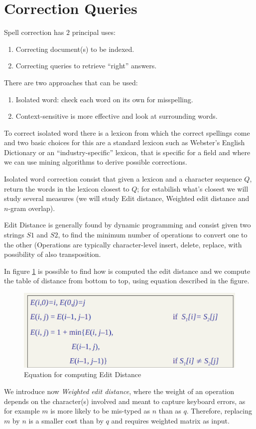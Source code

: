 \section{Correction Queries}
Spell correction has $2$ principal uses:
\begin{enumerate}
    \item Correcting document(s) to be indexed.
    \item Correcting queries to retrieve “right” answers.
\end{enumerate}
There are two approaches that can be used:
\begin{enumerate}
    \item Isolated word: check each word on its own for misspelling.
    \item Context-sensitive is more effective and look at surrounding words.
\end{enumerate}
To correct isolated word there is a lexicon from which the correct spellings come and two basic choices for this are
a standard lexicon such as Webster’s English Dictionary or an “industry-specific” lexicon, that is specific for a field and where
we can use mining algorithms to derive possible corrections.

Isolated word correction consist that given a lexicon and a character sequence $Q$, return the words in the lexicon closest
to $Q$; for estabilish what's closest we will study several measures (we will study Edit distance, Weighted edit distance and
$n$-gram overlap).

Edit Distance is generally found by dynamic programming and consist given two strings $S1$ and $S2$, to find the minimum number of 
operations to convert one to the other (Operations are typically character-level insert, delete, replace, with possibility of also transposition.

In figure \ref{img:editDistance} is possible to find how is computed the edit distance and we compute the table of distance from 
bottom to top, using equation described in the figure.

\begin{figure}
	\caption{Equation for computing Edit Distance}
	\label{img:editDistance}
	\includegraphics[width=\textwidth]{Images/editDistance}
\end{figure}
We introduce now \emph{Weighted edit distance}, where the weight of an operation depends on the character(s) involved and 
meant to capture keyboard errors, as for example $m$ is more likely to be mis-typed as $n$ than as $q$.\newline
Therefore, replacing $m$ by $n$ is a smaller cost than by $q$ and requires weighted matrix as input.

